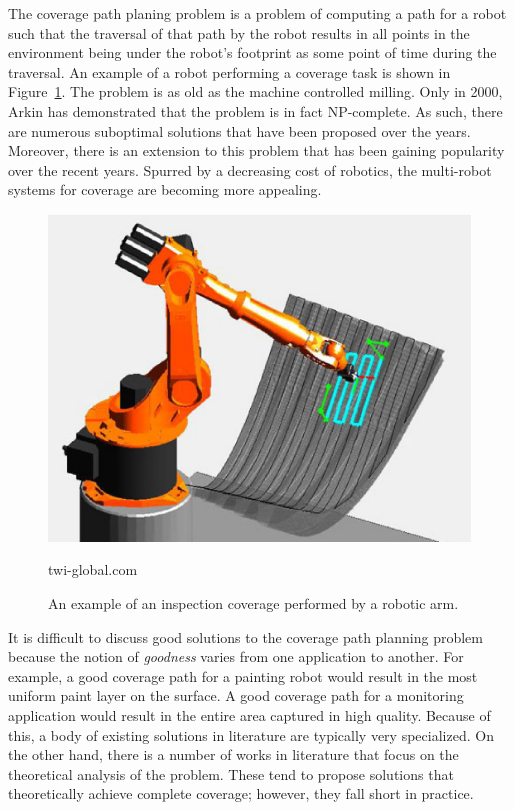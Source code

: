 \documentclass[../main.tex]{subfiles}
\begin{document}
The coverage path planing problem is a problem of computing a path for a robot such that the traversal of that path by the robot results in all points in the environment being under the robot's footprint as some point of time during the traversal. An example of a robot performing a coverage task is shown in Figure~\ref{img:example_coverage}. The problem is as old as the machine controlled milling. Only in 2000, Arkin\cite{arkin2000approximation} has demonstrated that the problem is in fact NP-complete. As such, there are numerous suboptimal solutions that have been proposed over the years. Moreover, there is an extension to this problem that has been gaining popularity over the recent years. Spurred by a decreasing cost of robotics, the multi-robot systems for coverage are becoming more appealing.
\begin{figure}
	\centering
	\includegraphics[scale=0.5]{img/chapter_1/example_coverage.eps}
	\vskip-15pt
	\caption*{\tiny twi-global.com}
	\caption{An example of an inspection coverage performed by a robotic arm.}
	\label{img:example_coverage}
\end{figure}

It is difficult to discuss good solutions to the coverage path planning problem because the notion of \emph{goodness} varies from one application to another. For example, a good coverage path for a painting robot would result in the most uniform paint layer on the surface. A good coverage path for a monitoring application would result in the entire area captured in high quality. Because of this, a body of existing solutions in literature are typically very specialized. On the other hand, there is a number of works in literature that focus on the theoretical analysis of the problem. These tend to propose solutions that theoretically achieve complete coverage; however, they fall short in practice.
\end{document}
